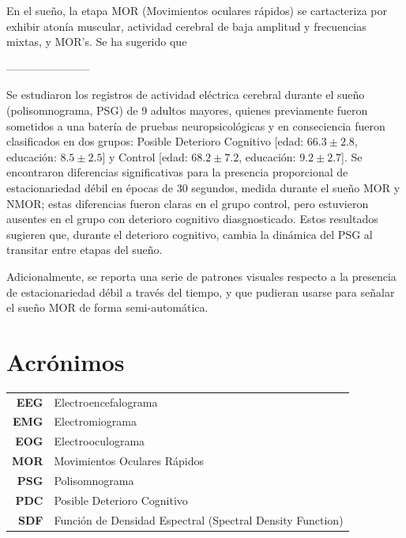 \documentclass[12pt,a4paper]{mitthesis}
\begin{document}
En el sue\~no, la etapa MOR (Movimientos oculares r\'apidos) se cartacteriza por exhibir aton\'ia
muscular, actividad cerebral de baja amplitud y frecuencias mixtas, y MOR's. Se ha sugerido que

-----------------------

Se estudiaron los registros de actividad el\'ectrica cerebral durante el sue\~no (polisomnograma, 
PSG) de 9 adultos mayores, quienes previamente fueron sometidos a una bater\'ia de pruebas 
neuropsicol\'ogicas y en conseciencia fueron clasificados en dos grupos: Posible Deterioro Cognitivo 
[edad: $66.3 \pm 2.8$, educaci\'on: $8.5 \pm 2.5$] y Control [edad: $68.2 \pm 7.2$, educaci\'on: 
$9.2 \pm 2.7$].
Se encontraron diferencias significativas para la presencia proporcional de 
estacionariedad d\'ebil en \'epocas de 30 segundos, medida durante el sue\~no MOR y NMOR;
estas diferencias fueron claras en el grupo control, pero estuvieron ausentes en el grupo con
deterioro cognitivo diasgnosticado.
Estos resultados sugieren que, durante el deterioro cognitivo, cambia la din\'amica del PSG al 
transitar entre etapas del sue\~no.

Adicionalmente, se reporta una serie de patrones visuales respecto a la presencia de 
estacionariedad d\'ebil a trav\'es del tiempo, y que pudieran usarse para se\~nalar el sue\~no
MOR de forma semi-autom\'atica.



\chapter*{Acr\'onimos}

\begin{tabular}{rl}
\textbf{EEG} & Electroencefalograma %
\\
\textbf{EMG} & Electromiograma %
\\
\textbf{EOG} & Electrooculograma %
\\
\textbf{MOR} & Movimientos Oculares R\'apidos
\\
\textbf{PSG} & Polisomnograma %
\\
\textbf{PDC} & Posible Deterioro Cognitivo
\\
\textbf{SDF} & Funci\'on de Densidad Espectral (Spectral Density Function)
\end{tabular}
\end{document}
